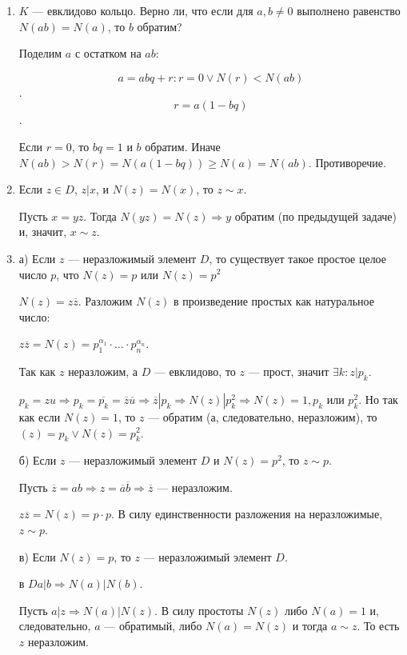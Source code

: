 \documentclass[../main.tex]{subfiles}
\begin{document}
\begin{enumerate}
\item $K$ --- евклидово кольцо. Верно ли, что если для $a, b \ne 0$ выполнено равенство $N(ab) = N(a)$, то $b$ обратим?


Поделим $a$ с остатком на $ab$:

$$a = abq + r: r=0 \lor N(r) < N(ab)$$.
$$r = a(1 - bq)$$.

Если $r=0$, то $bq = 1$ и $b$ обратим. Иначе $N(ab) > N(r) = N(a(1 - bq)) \geqslant N(a) = N(ab)$. Противоречие.


\item Если $z \in D$, $z | x$, и $N(z) = N(x)$, то $z \sim x$.

Пусть $x = yz$. Тогда $N(yz) = N(z) \Rightarrow y$ обратим (по предыдущей задаче) и, значит, $x \sim z$.

\item а) Если $z$ --- неразложимый элемент $D$, то существует такое простое целое число $p$, что $N(z) = p$ или $N(z) = p^2$

$N(z) = z\overline{z}$. Разложим $N(z)$ в произведение простых как натуральное число:

$z\overline{z} = N(z) = p_1^{\alpha_1} \cdot \ldots \cdot p_n^{\alpha_n}$.

Так как $z$ неразложим, а $D$ --- евклидово, то $z$ --- прост, значит $\exists k: z | p_k$.

$p_k = zu \Rightarrow p_k = \overline{p_k} = \overline{z}\overline{u} \Rightarrow \overline{z} | p_k \Rightarrow N(z) | p_k^2 \Rightarrow N(z) = 1, p_k$ или $p_k^2$. Но так как если $N(z) = 1$, то $z$ --- обратим (а, следовательно, неразложим), то $(z) = p_k \lor N(z) = p_k^2$.


б) Если $z$ — неразложимый элемент $D$ и $N(z) = p^2$, то $z \sim p$.

Пусть $\overline{z} = ab \Rightarrow z = \overline{a} \overline{b} \Rightarrow \overline{z}$ --- неразложим.

$z \overline{z} = N(z) = p \cdot p$. В силу единственности разложения на неразложимые, $z \sim p$.

в) Если $N(z) = p$, то $z$ --- неразложимый элемент $D$.

в $D a|b \Rightarrow N(a) | N(b)$.

Пусть $a | z \Rightarrow N(a) | N(z)$. В силу простоты $N(z)$ либо $N(a) = 1$ и, следовательно, $a$ --- обратимый, либо $N(a) = N(z)$ и тогда $a \sim z$. То есть $z$ неразложим.



\end{enumerate}
\end{document}
